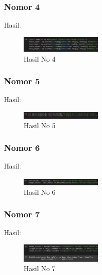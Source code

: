 \subsubsection{Nomor 4}
\hfill\break

Hasil:
\begin{figure}[H]
\centering
	\includegraphics[width=4cm]{figures/1174053/7/no4.jpg}
	\caption{Hasil No 4}
\end{figure}

\subsubsection{Nomor 5}
\hfill\break

Hasil:
\begin{figure}[H]
\centering
	\includegraphics[width=4cm]{figures/1174053/7/no5.jpg}
	\caption{Hasil No 5}
\end{figure}

\subsubsection{Nomor 6}
\hfill\break

Hasil:
\begin{figure}[H]
\centering
	\includegraphics[width=4cm]{figures/1174053/7/no6.jpg}
	\caption{Hasil No 6}
\end{figure}

\subsubsection{Nomor 7}
\hfill\break

Hasil:
\begin{figure}[H]
\centering
	\includegraphics[width=4cm]{figures/1174053/7/no7.jpg}
	\caption{Hasil No 7}
\end{figure}


